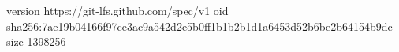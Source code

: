 version https://git-lfs.github.com/spec/v1
oid sha256:7ae19b04166f97ce3ac9a542d2e5b0ff1b1b2b1d1a6453d52b6be2b64154b9dc
size 1398256
